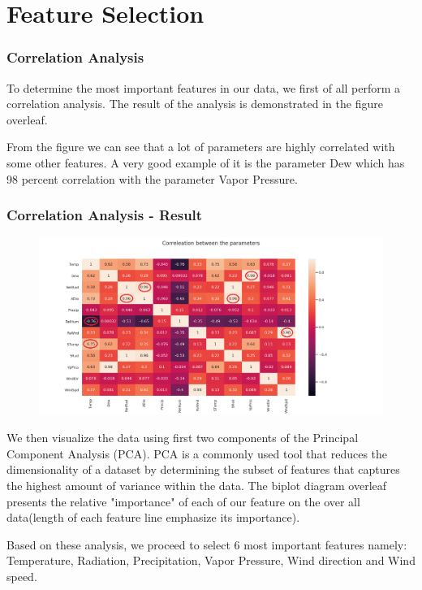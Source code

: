 \section{Feature Selection}

\begin{frame}
\frametitle{Correlation Analysis}
To determine the most important features in our data, we first of all perform a correlation analysis. The result of the analysis is demonstrated in the figure overleaf. 

From the figure we can see that a lot of parameters are highly correlated with some other features. A very good example of it is the parameter Dew which has 98 percent correlation with the parameter Vapor Pressure.
\end{frame}

\begin{frame}
\frametitle{Correlation Analysis - Result}
\begin{figure}
	\includegraphics[width=1\textwidth]{images/correleation.png}
\end{figure}
\end{frame}

\begin{frame}
We then visualize the data using first two components of the Principal Component Analysis (PCA). PCA is a commonly used tool that reduces the dimensionality of a dataset by determining the subset of features that captures the highest amount of variance within the data. The biplot diagram overleaf presents the relative "importance" of each of our feature on the over all data(length of each feature line emphasize its importance).


Based on these analysis, we proceed to select 6 most important features namely: Temperature, Radiation, Precipitation, Vapor Pressure, Wind direction and Wind speed.
\end{frame}


